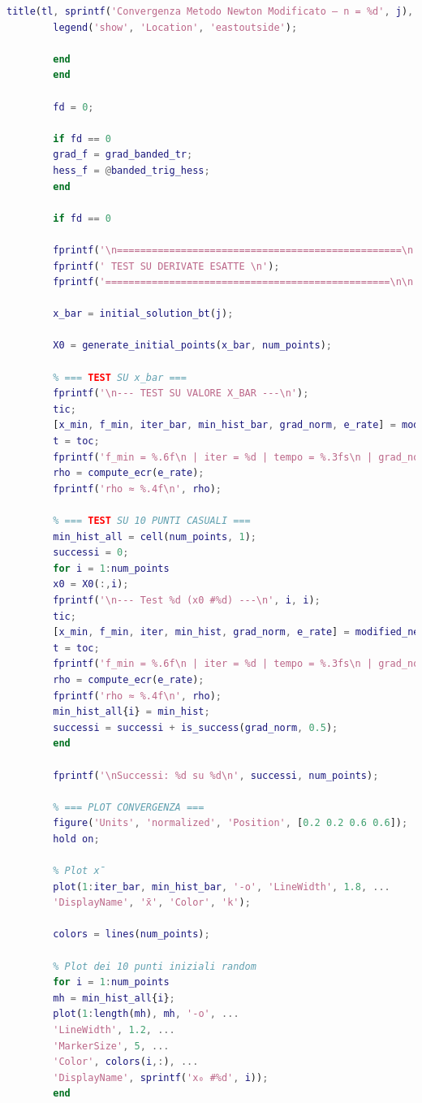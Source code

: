 \documentclass[a4paper,12pt]{article}
\begin{document}
\begin{lstlisting}[language=Matlab,caption={Full script: Modified Newton method on Banded Trigonometric},label={lst:rosenbrock-extended}]
		title(tl, sprintf('Convergenza Metodo Newton Modificato – n = %d', j), 'FontSize', 14);
		legend('show', 'Location', 'eastoutside');
		
		end
		end
		
		fd = 0;
		
		if fd == 0
		grad_f = grad_banded_tr;
		hess_f = @banded_trig_hess;
		end
		
		if fd == 0
		
		fprintf('\n=================================================\n');
		fprintf(' TEST SU DERIVATE ESATTE \n');
		fprintf('=================================================\n\n');
		
		x_bar = initial_solution_bt(j);
		
		X0 = generate_initial_points(x_bar, num_points);
		
		% === TEST SU x_bar ===
		fprintf('\n--- TEST SU VALORE X_BAR ---\n');
		tic;
		[x_min, f_min, iter_bar, min_hist_bar, grad_norm, e_rate] = modified_newton(banded_tr,grad_f,hess_f,x_bar,tol,max_iter,fd,[],[]);
		t = toc;
		fprintf('f_min = %.6f\n | iter = %d | tempo = %.3fs\n | grad_norm = %.6f\n', f_min, iter_bar, t, grad_norm);
		rho = compute_ecr(e_rate);
		fprintf('rho ≈ %.4f\n', rho);
		
		% === TEST SU 10 PUNTI CASUALI ===
		min_hist_all = cell(num_points, 1);
		successi = 0;
		for i = 1:num_points
		x0 = X0(:,i);
		fprintf('\n--- Test %d (x0 #%d) ---\n', i, i);
		tic;
		[x_min, f_min, iter, min_hist, grad_norm, e_rate] = modified_newton(banded_tr,grad_f,hess_f,x0,tol,max_iter,fd,[],[]);
		t = toc;
		fprintf('f_min = %.6f\n | iter = %d | tempo = %.3fs\n | grad_norm = %.6f\n', f_min, iter, t, grad_norm);
		rho = compute_ecr(e_rate);
		fprintf('rho ≈ %.4f\n', rho);
		min_hist_all{i} = min_hist;
		successi = successi + is_success(grad_norm, 0.5);
		end
		
		fprintf('\nSuccessi: %d su %d\n', successi, num_points);
		
		% === PLOT CONVERGENZA ===
		figure('Units', 'normalized', 'Position', [0.2 0.2 0.6 0.6]);  % finestra grande
		hold on;
		
		% Plot x̄
		plot(1:iter_bar, min_hist_bar, '-o', 'LineWidth', 1.8, ...
		'DisplayName', 'x̄', 'Color', 'k');
		
		colors = lines(num_points);
		
		% Plot dei 10 punti iniziali random
		for i = 1:num_points
		mh = min_hist_all{i};
		plot(1:length(mh), mh, '-o', ...
		'LineWidth', 1.2, ...
		'MarkerSize', 5, ...
		'Color', colors(i,:), ...
		'DisplayName', sprintf('x₀ #%d', i));
		end
		

\end{lstlisting}
\end{document}
